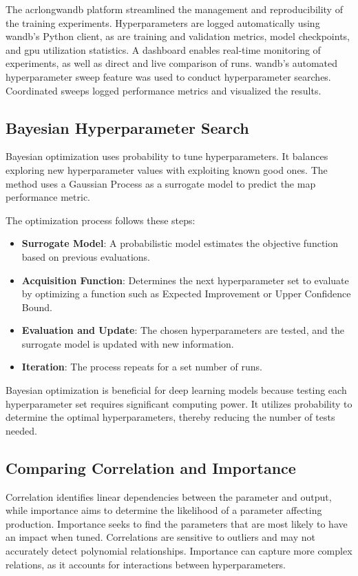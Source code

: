 The acrlong{wandb} platform streamlined the management and reproducibility of the training experiments. Hyperparameters are logged automatically using \acrshort{wandb}'s Python client, as are training and validation metrics, model checkpoints, and \acrshort{gpu} utilization statistics. A dashboard enables real-time monitoring of experiments, as well as direct and live comparison of runs. \acrshort{wandb}'s automated hyperparameter sweep feature was used to conduct hyperparameter searches. Coordinated sweeps logged performance metrics and visualized the results. 

\subsection{Bayesian Hyperparameter Search}

Bayesian optimization uses probability to tune hyperparameters. It balances exploring new hyperparameter values with exploiting known good ones. The method uses a Gaussian Process as a surrogate model to predict the \acrlong{map} performance metric.

The optimization process follows these steps:
\begin{itemize}
    \item \textbf{Surrogate Model}: A probabilistic model estimates the objective function based on previous evaluations.
    \item \textbf{Acquisition Function}: Determines the next hyperparameter set to evaluate by optimizing a function such as Expected Improvement or Upper Confidence Bound.
    \item \textbf{Evaluation and Update}: The chosen hyperparameters are tested, and the surrogate model is updated with new information.
    \item \textbf{Iteration}: The process repeats for a set number of runs.
\end{itemize}

Bayesian optimization is beneficial for deep learning models because testing each hyperparameter set requires significant computing power. It utilizes probability to determine the optimal hyperparameters, thereby reducing the number of tests needed.


\subsection{Comparing Correlation and Importance}


Correlation identifies linear dependencies between the parameter and output, while importance aims to determine the likelihood of a parameter affecting production. Importance seeks to find the parameters that are most likely to have an impact when tuned. Correlations are sensitive to outliers and may not accurately detect polynomial relationships. Importance can capture more complex relations, as it accounts for interactions between hyperparameters. 

